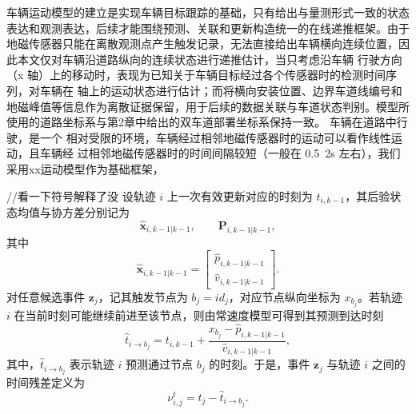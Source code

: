 \documentclass{xdupgthesis}
\begin{document}
车辆运动模型的建立是实现车辆目标跟踪的基础，只有给出与量测形式一致的状态表达和观测表达，后续才能围绕预测、关联和更新构造统一的在线递推框架。由于地磁传感器只能在离散观测点产生触发记录，无法直接给出车辆横向连续位置，因此本文仅对车辆沿道路纵向的连续状态进行递推估计，当只考虑沿车辆 行驶方向（x 轴）上的移动时，表现为已知关于车辆目标经过各个传感器时的检测时间序列，对车辆在 轴上的运动状态进行估计；而将横向安装位置、边界车道线编号和地磁峰值等信息作为离散证据保留，用于后续的数据关联与车道状态判别。模型所使用的道路坐标系与第2章中给出的双车道部署坐标系保持一致。
车辆在道路中行驶，是一个 相对受限的环境，车辆经过相邻地磁传感器时的运动可以看作线性运动，且车辆经 过相邻地磁传感器时的时间间隔较短（一般在 0.5~2s 左右），我们采用xx运动模型作为基础框架，



//看一下符号解释了没
设轨迹 $i$ 上一次有效更新对应的时刻为 $t_{i,k-1}$，其后验状态均值与协方差分别记为
\begin{equation}
	\hat{\mathbf x}_{i,k-1|k-1},\qquad
	\mathbf P_{i,k-1|k-1},
	\label{eq:ch3_prev_state}
\end{equation}
其中
\begin{equation}
	\hat{\mathbf x}_{i,k-1|k-1}=
	\begin{bmatrix}
		\hat p_{i,k-1|k-1}\\
		\hat v_{i,k-1|k-1}
	\end{bmatrix}.
	\label{eq:ch3_prev_state_vec}
\end{equation}
对任意候选事件 $\mathbf z_j$，记其触发节点为 $b_j=id_j$，对应节点纵向坐标为 $x_{b_j}$。若轨迹 $i$ 在当前时刻可能继续前进至该节点，则由常速度模型可得到其预测到达时刻
\begin{equation}
	\hat t_{i\rightarrow b_j}
	=
	t_{i,k-1}
	+
	\frac{x_{b_j}-\hat p_{i,k-1|k-1}}{\hat v_{i,k-1|k-1}},
	\label{eq:ch3_pred_time}
\end{equation}
其中，$\hat t_{i\rightarrow b_j}$ 表示轨迹 $i$ 预测通过节点 $b_j$ 的时刻。于是，事件 $\mathbf z_j$ 与轨迹 $i$ 之间的时间残差定义为
\begin{equation}
	\nu^{t}_{i,j}
	=
	t_j-\hat t_{i\rightarrow b_j}.
	\label{eq:ch3_time_residual}
\end{equation}
\end{document}
